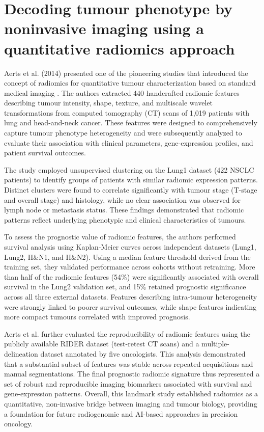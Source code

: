 \section{Decoding tumour phenotype by noninvasive imaging using a quantitative radiomics approach}

Aerts et al. (2014) presented one of the pioneering studies that introduced the concept of radiomics for quantitative tumour characterization based on standard medical imaging \cite{Aerts2014-bg}. The authors extracted 440 handcrafted radiomic features describing tumour intensity, shape, texture, and multiscale wavelet transformations from computed tomography (CT) scans of 1,019 patients with lung and head-and-neck cancer. These features were designed to comprehensively capture tumour phenotype heterogeneity and were subsequently analyzed to evaluate their association with clinical parameters, gene-expression profiles, and patient survival outcomes.

The study employed unsupervised clustering on the Lung1 dataset (422 NSCLC patients) to identify groups of patients with similar radiomic expression patterns. Distinct clusters were found to correlate significantly with tumour stage (T-stage and overall stage) and histology, while no clear association was observed for lymph node or metastasis status. These findings demonstrated that radiomic patterns reflect underlying phenotypic and clinical characteristics of tumours.

To assess the prognostic value of radiomic features, the authors performed survival analysis using Kaplan-Meier curves across independent datasets (Lung1, Lung2, H\&N1, and H\&N2). Using a median feature threshold derived from the training set, they validated performance across cohorts without retraining. More than half of the radiomic features (54\%) were significantly associated with overall survival in the Lung2 validation set, and 15\% retained prognostic significance across all three external datasets. Features describing intra-tumour heterogeneity were strongly linked to poorer survival outcomes, while shape features indicating more compact tumours correlated with improved prognosis.

Aerts et al. further evaluated the reproducibility of radiomic features using the publicly available RIDER dataset (test-retest CT scans) and a multiple-delineation dataset annotated by five oncologists. This analysis demonstrated that a substantial subset of features was stable across repeated acquisitions and manual segmentations. The final prognostic radiomic signature thus represented a set of robust and reproducible imaging biomarkers associated with survival and gene-expression patterns. Overall, this landmark study established radiomics as a quantitative, non-invasive bridge between imaging and tumour biology, providing a foundation for future radiogenomic and AI-based approaches in precision oncology.
